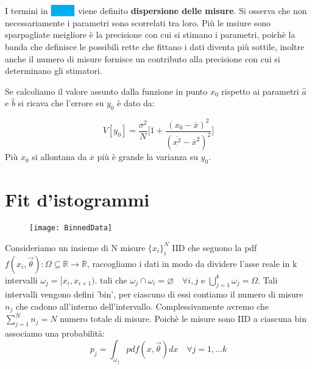 \documentclass[11pt,a4paper]{book}
\begin{document}
I termini in $\colorbox{cyan}{\phantom{b = \,}}$ viene definito \textbf{dispersione delle misure}. Si osserva che non necessariamente i parametri sono scorrelati tra loro. Pi\`{u} le msiure sono sparpagliate meigliore \`{e} la precisione con cui si stimano i parametri, poich\`{e} la banda che definisce le possibili rette che fittano i dati diventa pi\`{u} sottile, inoltre anche il numero di misure fornisce un contributo alla precisione con cui si determinano gli stimatori. \newline

\noindent Se calcoliamo il valore assunto dalla funzione in punto $x_0$ rispetto ai parametri $\hat{a}$ e $\hat{b}$ si ricava che l'errore su $y_0$ \`{e} dato da:

\begin{equation*}
	V[y_0] = \dfrac{\sigma^2}{N} \Big[ 1 + \dfrac{(x_0 - \overline{x})^2}{(\overline{x^2} - \overline{x}^2 )^2} \Big ]
\end{equation*}
Pi\`{u} $x_0$ si allontana da $\overline{x}$ pi\`{u} \`{e} grande la varianza su $y_0$.

\section{Fit d'istogrammi}
\begin{wrapfigure}{l}{0.\textwidth}
\centering
\texttt{[image: BinnedData]}	
\end{wrapfigure}
Consideriamo un insieme di N misure $\{x_{i}\}_i^N$ IID che seguono la pdf $f(x_i,\vec{\theta}): \Omega \subseteq \mathbb{R} \rightarrow \mathbb{R}$, raccogliamo i dati in modo da dividere l'asse reale in k intervalli $\omega_j = [x_i,x_{i+1})$. tali che $\omega_j \cap \omega_i = \varnothing \quad \forall i,j$ e $\bigcup_{j=1}^k \omega_j = \Omega$. Tali intervalli vengono defini 'bin', per ciascuno di essi contiamo il numero di misure $n_j$ che cadono all'interno dell'intervallo. Complessivamente avremo che $\sum_{j=1}^N n_j = N$ numero totale di misure. Poich\`{e} le misure sono IID a ciascuna bin associamo una probabilit\`{a}:
\begin{equation*}
	p_j = \int_{\omega_j}pdf(x,\vec{\theta})dx \quad \forall j =1,...k
\end{equation*} 
\end{document}
